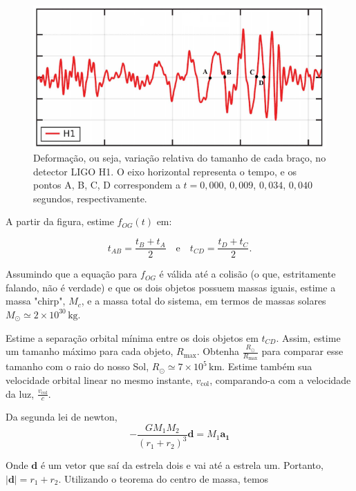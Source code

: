\documentclass[11pt]{article}
\begin{document}
\begin{pproblem}
\begin{alternativas}
    \begin{figure}[H]
        \centering
        \includegraphics[width=0.7\linewidth]{imagens/grafico OG 1.png}
        \caption{Deformação, ou seja, variação relativa do tamanho de cada braço, no detector LIGO H1. O eixo horizontal representa o tempo, e os pontos A, B, C, D correspondem a \(t = 0,000\), \(0,009\), \(0,034\), \(0,040\) segundos, respectivamente.}
    \end{figure}

    \item A partir da figura, estime \( f_{OG}(t) \) em:

    \[
    t_{AB} = \frac{t_B + t_A}{2} \quad \text{e} \quad t_{CD} = \frac{t_D + t_C}{2}.
    \]
    
    Assumindo que a equação para \(f_{OG}\) é válida até a colisão (o que, estritamente falando, não é verdade) e que os dois objetos possuem massas iguais, estime a massa "chirp", \( M_c \), e a massa total do sistema, em termos de massas solares \( M_\odot \simeq 2 \times 10^{30} \, \text{kg}\).

    \item Estime a separação orbital mínima entre os dois objetos em \( t_{CD} \). 
    Assim, estime um tamanho máximo para cada objeto, \( R_{\text{max}} \). 
    Obtenha \( \frac{R_\odot}{R_{\text{max}}} \) para comparar esse tamanho com o raio do nosso Sol, \( R_\odot \simeq 7 \times 10^5 \, \text{km} \). 
    Estime também sua velocidade orbital linear no mesmo instante, \( v_{\text{col}} \), comparando-a com a velocidade da luz, \( \frac{v_{\text{col}}}{c} \).
\end{alternativas}

\begin{pssolution*}{}{}
    \begin{alternativas}
        \item Da segunda lei de newton, 
        \[-\frac{GM_1M_2}{(r_1+r_2)^3}\mathbf{d} = M_1\mathbf{a_1}\]

        Onde \(\mathbf{d}\) é um vetor que saí da estrela dois e vai até a estrela um. Portanto, \(|\mathbf{d}| = r_1+r_2\). Utilizando o teorema do centro de massa, temos 


\end{alternativas}
\end{pssolution*}
\end{pproblem}
\end{document}

